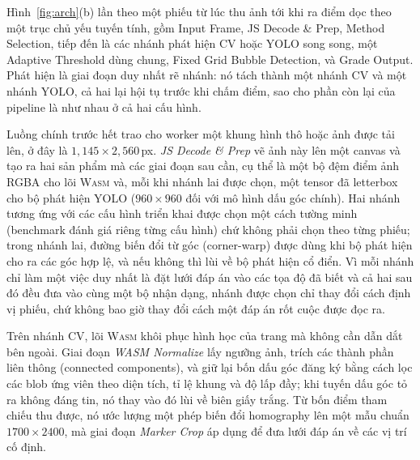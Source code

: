 \documentclass[conference]{IEEEtran}
\newcommand{\wasm}{\textnormal{\textsc{Wasm}}}
\begin{document}
Hình~\ref{fig:arch}(b) lần theo một phiếu từ lúc thu ảnh tới khi ra điểm dọc theo
một trục chủ yếu tuyến tính, gồm Input Frame, JS Decode \& Prep, Method Selection,
tiếp đến là các nhánh phát hiện CV hoặc YOLO song song, một Adaptive Threshold
dùng chung, Fixed Grid Bubble Detection, và Grade Output. Phát hiện là giai đoạn
duy nhất rẽ nhánh: nó tách thành một nhánh CV và một nhánh YOLO, cả hai lại hội tụ
trước khi chấm điểm, sao cho phần còn lại của pipeline là như nhau ở cả hai cấu
hình.

Luồng chính trước hết trao cho worker một khung hình thô hoặc ảnh được tải lên, ở
đây là $1{,}145\times2{,}560$\,px. \emph{JS Decode \& Prep} vẽ ảnh này lên một
canvas và tạo ra hai sản phẩm mà các giai đoạn sau cần, cụ thể là một bộ đệm điểm
ảnh RGBA cho lõi \wasm{} và, mỗi khi nhánh lai được chọn, một tensor đã
letterbox cho bộ phát hiện YOLO ($960\times960$ đối với mô hình dấu góc chính).
Hai nhánh tương ứng với các cấu hình triển khai được chọn một cách tường minh
(benchmark đánh giá riêng từng cấu hình) chứ không phải chọn theo từng phiếu;
trong nhánh lai, đường biến đổi từ góc (corner-warp) được dùng khi bộ phát hiện
cho ra các góc hợp lệ, và nếu không thì lùi về bộ phát hiện cổ điển. Vì mỗi nhánh
chỉ làm một việc duy nhất là đặt lưới đáp án vào các tọa độ đã biết và cả hai sau
đó đều đưa vào cùng một bộ nhận dạng, nhánh được chọn chỉ thay đổi cách định vị
phiếu, chứ không bao giờ thay đổi cách một đáp án rốt cuộc được đọc ra.

Trên nhánh CV, lõi \wasm{} khôi phục hình học của trang mà không cần dẫn dắt bên
ngoài. Giai đoạn \emph{WASM Normalize} lấy ngưỡng ảnh, trích các thành phần liên
thông (connected components), và giữ lại bốn dấu góc đăng ký bằng cách lọc các
blob ứng viên theo diện tích, tỉ lệ khung và độ lấp đầy; khi tuyến dấu góc tỏ ra
không đáng tin, nó thay vào đó lùi về biên giấy trắng. Từ bốn điểm tham chiếu thu
được, nó ước lượng một phép biến đổi homography lên một mẫu chuẩn
$1700\times2400$, mà giai đoạn \emph{Marker Crop} áp dụng để đưa lưới đáp án về
các vị trí cố định.
\end{document}
